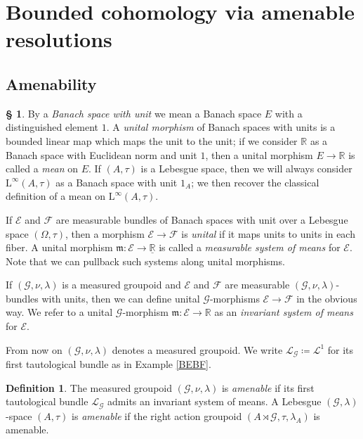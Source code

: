 \documentclass[11pt, oneside]{amsart}
\theoremstyle{definition}
\newtheorem{defn}[lemma]{Definition}
\newtheorem{no}[lemma]{\S}
\theoremstyle{remark}
\theoremstyle{TheoremNum}
\renewcommand{\L}{\mathfrak}
\newcommand\cF{{\mathcal F}}
\newcommand{\cE}{\mathcal E}
\newcommand{\Linf}{\mathrm{L}^{\infty}}
\newcommand{\cG}{\mathcal{G}}
\newcommand{\bR}{\mathbb{R}}
\newcommand{\cL}{\mathcal L}
\begin{document}
\section{Bounded cohomology via amenable resolutions}\label{sec:amenable}

\subsection{Amenability}\label{sec:6.1}
\begin{no} By a \emph{Banach space with unit} we mean a Banach space $E$  with a distinguished element $1$. A \emph{unital morphism} of Banach spaces with units is a bounded linear map which maps the unit to the unit; if we consider $\bR$ as a Banach space with Euclidean norm and unit $1$, then a unital morphism $E \to \bR$ is called a \emph{mean} on $E$. If $(A, \tau)$ is a Lebesgue space, then we will always consider $\Linf(A,\tau)$ as a Banach space with unit $1_A$; we then recover the classical definition of a mean on $\Linf(A, \tau)$. 

If $\cE$ and $\cF$ are measurable bundles of Banach spaces with unit over a Lebesgue space $(\Omega,\tau)$, then a morphism $\cE \to \cF$ is \emph{unital} if it maps units to units in each fiber. A unital morphism $\L m: \cE \to \underline{\bR}$ is called a \emph{measurable system of means} for $\cE$. Note that we can pullback such systems along unital morphisms.

If $(\cG, \nu, \lambda)$ is a measured groupoid and $\cE$ and $\cF$ are measurable $(\cG, \nu, \lambda)$-bundles with units, then we can define unital $\cG$-morphisms $\cE \to \cF$ in the obvious way. We refer to a unital $\cG$-morphism $\L m: \cE \to \bR$ as an \emph{invariant system of means} for $\cE$.
\end{no}
From now on $(\cG, \nu, \lambda)$ denotes a measured groupoid. We write $\cL_\cG \coloneqq \cL^1$ for its first tautological bundle as in Example \ref{BEBF}.
\begin{defn}\label{DefAmenable}
The measured groupoid $(\cG, \nu, \lambda)$ is \emph{amenable} if its first tautological bundle $\cL_{\cG}$ admits an invariant system of means. A  Lebesgue $(\mathcal{G},\lambda)$-space $(A,\tau)$ is \emph{amenable} if the right action groupoid $(A \rtimes \cG, \tau, \lambda_A)$ is amenable.
\end{defn}
\end{document}
